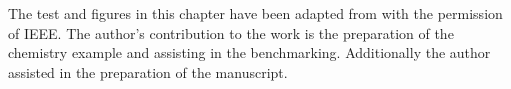 
The test and figures in this chapter have been adapted from  with the permission of IEEE.
The author's contribution to the work is the preparation of the chemistry example and assisting in the benchmarking. Additionally the author assisted in the preparation of the manuscript.
